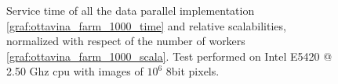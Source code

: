 \begin{figure}[p]
\centering
{}
\caption{ Service time of all the data parallel implementation \ref{graf:ottavina_farm_1000_time} and relative scalabilities, normalized with respect of the number of workers \ref{graf:ottavina_farm_1000_scala}. Test performed on Intel E5420 @ 2.50 Ghz cpu with images of $10^6$ 8bit pixels.}
\label{chart:ottavina_alldata_1000}
\end{figure}

